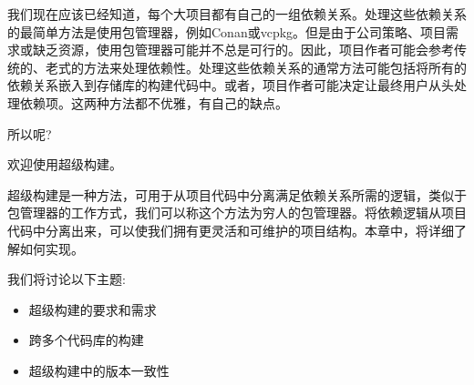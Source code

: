 我们现在应该已经知道，每个大项目都有自己的一组依赖关系。处理这些依赖关系的最简单方法是使用包管理器，例如Conan或vcpkg。但是由于公司策略、项目需求或缺乏资源，使用包管理器可能并不总是可行的。因此，项目作者可能会参考传统的、老式的方法来处理依赖性。处理这些依赖关系的通常方法可能包括将所有的依赖关系嵌入到存储库的构建代码中。或者，项目作者可能决定让最终用户从头处理依赖项。这两种方法都不优雅，有自己的缺点。

所以呢?

欢迎使用超级构建。

超级构建是一种方法，可用于从项目代码中分离满足依赖关系所需的逻辑，类似于包管理器的工作方式，我们可以称这个方法为穷人的包管理器。将依赖逻辑从项目代码中分离出来，可以使我们拥有更灵活和可维护的项目结构。本章中，将详细了解如何实现。

我们将讨论以下主题:

\begin{itemize}
\item 
超级构建的要求和需求

\item 
跨多个代码库的构建

\item 
超级构建中的版本一致性
\end{itemize}


















